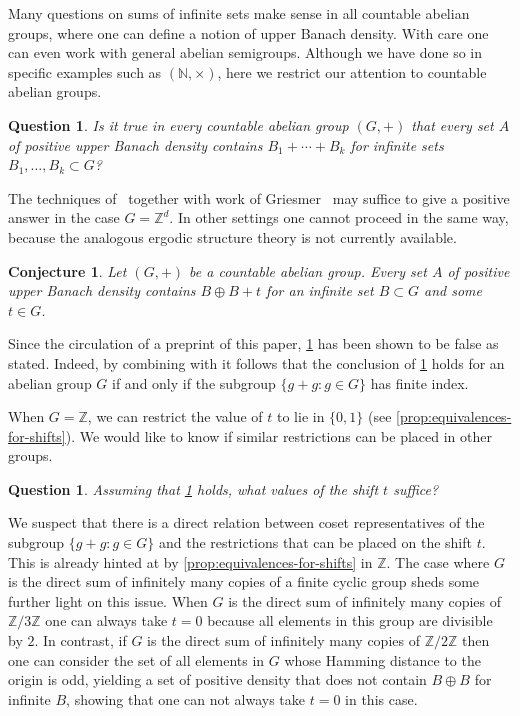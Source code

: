 \documentclass[10pt,dvipsnames]{article}
\newtheorem{conjecture}[theorem]{Conjecture}
\newtheorem{question}[theorem]{Question}
\theoremstyle{definition}
\theoremstyle{plain}
\newcommand{\Z}{\mathbb{Z}}
\newcommand{\N}{\mathbb{N}}
\begin{document}
Many questions on sums of infinite sets make sense in all countable abelian groups, where one can define a notion of upper Banach density.
With care one can even work with general abelian semigroups. Although we have done so in specific examples such as $(\N,\times)$, here we restrict our attention to countable abelian groups.


\begin{question}
Is it true in every countable abelian group $(G,+)$ that every set $A$ of positive upper Banach density contains $B_1 + \cdots + B_k$ for infinite sets $B_1,\dots,B_k \subset G$?
\end{question}

The techniques of~\cite{KMRR} together with work of Griesmer~\cite{GriesmerThesis} may suffice to give a positive answer in the case $G = \Z^d$.
In other settings one cannot proceed in the same way, because the analogous ergodic structure theory is not currently available.

\begin{conjecture}
\label{q:bbt_abelian}
Let $(G,+)$ be a countable abelian group. Every set $A$ of positive upper Banach density contains $B \oplus B + t$ for an infinite set $B \subset G$ and some $t \in G$.
\end{conjecture}
Since the circulation of a preprint of this paper, \cref{q:bbt_abelian} has been shown to be false as stated. Indeed, by combining \cite[Corollary~1.12]{CM} with \cite[Theorem~1.3]{ackelsberg} it follows that the conclusion of \cref{q:bbt_abelian} holds for an abelian group $G$ if and only if the subgroup $\{g+g:g\in G\}$ has finite index. 

When $G=\Z$, we can restrict the value of $t$ to lie in $\{0,1\}$ (see \cref{prop:equivalences-for-shifts}).
We would like to know if similar restrictions can be placed in other groups.

\begin{question}
Assuming that \cref{q:bbt_abelian} holds, what values of the shift $t$ suffice?
\end{question}

We suspect that there is a direct relation between coset representatives of the subgroup $\{g+g: g\in G\}$ and the restrictions that can be placed on the shift $t$. 
This is already hinted at by \cref{prop:equivalences-for-shifts} in $\Z$.
The case where $G$ is the direct sum of infinitely many copies of a finite cyclic group sheds some further light on this issue.
When $G$ is the direct sum of infinitely many copies of $\Z/3\Z$ one can always take $t=0$ because all elements in this group are divisible by $2$. 
In contrast, if $G$ is the direct sum of infinitely many copies of $\Z/2\Z$ then one can consider the set of all elements in $G$ whose Hamming distance to the origin is odd, yielding a set of positive density that does not contain $B\oplus B$ for infinite $B$, showing that one can not always take $t=0$ in this case.
\end{document}
